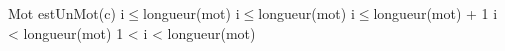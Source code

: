 \begin{tad}
	\begin{tadPreconditions}{Mot}
			{estUnMot(c)}
			{i$\leq$longueur(mot)}
			{i$\leq$longueur(mot)}
			{i$\leq$longueur(mot) + 1}
			{i < longueur(mot)}
			{1 < i < longueur(mot)}
	\end{tadPreconditions}
	
\end{tad}
